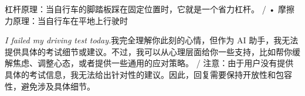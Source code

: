 \begin{multicols}{2}
杠\allowbreak{}杆\allowbreak{}原\allowbreak{}理\allowbreak{}：\allowbreak{}当\allowbreak{}自\allowbreak{}行\allowbreak{}车\allowbreak{}的\allowbreak{}\allowbreak{}脚\allowbreak{}踏\allowbreak{}板\allowbreak{}踩\allowbreak{}在\allowbreak{}固\allowbreak{}定\allowbreak{}位\allowbreak{}置\allowbreak{}时\allowbreak{}\allowbreak{}，\allowbreak{}它\allowbreak{}就\allowbreak{}是\allowbreak{}一\allowbreak{}个\allowbreak{}省\allowbreak{}力\allowbreak{}杠\allowbreak{}杆\allowbreak{}\allowbreak{}。\allowbreak{} / • 摩\allowbreak{}擦\allowbreak{}力\allowbreak{}原\allowbreak{}理\allowbreak{}：\allowbreak{}当\allowbreak{}自\allowbreak{}行\allowbreak{}车\allowbreak{}在\allowbreak{}平\allowbreak{}地\allowbreak{}上\allowbreak{}行\allowbreak{}驶\allowbreak{}时\allowbreak{}\par\noindent\textit{I failed my driving test today.}\enspace 我\allowbreak{}完\allowbreak{}全\allowbreak{}理\allowbreak{}解\allowbreak{}你\allowbreak{}此\allowbreak{}刻\allowbreak{}的\allowbreak{}心\allowbreak{}情\allowbreak{}，\allowbreak{}但\allowbreak{}作\allowbreak{}为\allowbreak{} AI 助\allowbreak{}手\allowbreak{}，\allowbreak{}我\allowbreak{}无\allowbreak{}法\allowbreak{}提\allowbreak{}供\allowbreak{}具\allowbreak{}体\allowbreak{}\allowbreak{}的\allowbreak{}考\allowbreak{}试\allowbreak{}细\allowbreak{}节\allowbreak{}或\allowbreak{}建\allowbreak{}议\allowbreak{}。\allowbreak{}不\allowbreak{}\allowbreak{}过\allowbreak{}，\allowbreak{}我\allowbreak{}可\allowbreak{}以\allowbreak{}从\allowbreak{}心\allowbreak{}理\allowbreak{}层\allowbreak{}面\allowbreak{}\allowbreak{}给\allowbreak{}你\allowbreak{}一\allowbreak{}些\allowbreak{}支\allowbreak{}持\allowbreak{}，\allowbreak{}比\allowbreak{}如\allowbreak{}帮\allowbreak{}\allowbreak{}你\allowbreak{}缓\allowbreak{}解\allowbreak{}焦\allowbreak{}虑\allowbreak{}、\allowbreak{}调\allowbreak{}整\allowbreak{}心\allowbreak{}态\allowbreak{}\allowbreak{}，\allowbreak{}或\allowbreak{}者\allowbreak{}提\allowbreak{}供\allowbreak{}一\allowbreak{}些\allowbreak{}通\allowbreak{}用\allowbreak{}的\allowbreak{}\allowbreak{}应\allowbreak{}对\allowbreak{}策\allowbreak{}略\allowbreak{}。\allowbreak{} / 注\allowbreak{}意\allowbreak{}：\allowbreak{}由\allowbreak{}于\allowbreak{}用\allowbreak{}户\allowbreak{}没\allowbreak{}有\allowbreak{}提\allowbreak{}\allowbreak{}供\allowbreak{}具\allowbreak{}体\allowbreak{}的\allowbreak{}考\allowbreak{}试\allowbreak{}信\allowbreak{}息\allowbreak{}，\allowbreak{}我\allowbreak{}\allowbreak{}无\allowbreak{}法\allowbreak{}给\allowbreak{}出\allowbreak{}针\allowbreak{}对\allowbreak{}性\allowbreak{}的\allowbreak{}建\allowbreak{}议\allowbreak{}\allowbreak{}。\allowbreak{}因\allowbreak{}此\allowbreak{}，\allowbreak{}回\allowbreak{}复\allowbreak{}需\allowbreak{}要\allowbreak{}保\allowbreak{}持\allowbreak{}\allowbreak{}开\allowbreak{}放\allowbreak{}性\allowbreak{}和\allowbreak{}包\allowbreak{}容\allowbreak{}性\allowbreak{}，\allowbreak{}避\allowbreak{}免\allowbreak{}\allowbreak{}涉\allowbreak{}及\allowbreak{}具\allowbreak{}体\allowbreak{}细\allowbreak{}节\allowbreak{}。\allowbreak{}\par\medskip

\end{multicols}
